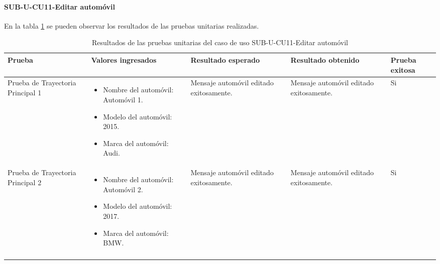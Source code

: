 \paragraph{SUB-U-CU11-Editar automóvil}\label{SUB-U-CU11:Pruebas}
En la tabla \ref{pruebas_unitarias_sub-u-cu11} se pueden observar los resultados de las pruebas unitarias realizadas.
\begin{longtable}{|M{2cm}| M{4.5cm}|M{3cm}|M{3cm}|M{1.5cm}|}
	\hline
	\textbf{Prueba} & \textbf{Valores ingresados} & \textbf{Resultado esperado} & \textbf{Resultado obtenido} & \textbf{Prueba exitosa} \\ \hline
	Prueba de Trayectoria Principal 1 & 
	\begin{itemize}
		\item Nombre del automóvil: Automóvil 1.
		\item Modelo del automóvil: 2015.
		\item Marca del automóvil: Audi.
	\end{itemize}
	& 
	Mensaje automóvil editado exitosamente.
	&
	Mensaje automóvil editado exitosamente.
	& Si \\ \hline

	Prueba de Trayectoria Principal 2 & 
	\begin{itemize}
		\item Nombre del automóvil: Automóvil 2.
		\item Modelo del automóvil: 2017.
		\item Marca del automóvil: BMW.
	\end{itemize}
	& 
	Mensaje automóvil editado exitosamente.
	&
	Mensaje automóvil editado exitosamente.
	& Si \\ \hline

	\caption{Resultados de las pruebas unitarias del caso de uso SUB-U-CU11-Editar automóvil}
	\label{pruebas_unitarias_sub-u-cu11}
\end{longtable}